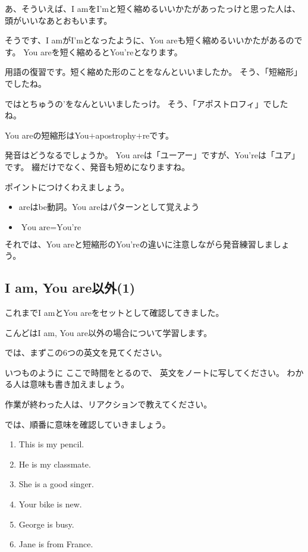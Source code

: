 \documentclass[book,jafontscale=0.9247]{jlreq}
\newcommand{\mySagyo}{%
\begin{minipage}[t]{.98\textwidth}
\mbox{}\hrulefill\mbox{}\par%
\mbox{}\hfill{}\raisebox{-5pt}{作業}\hfill\mbox{}\par%
\mbox{}\hrulefill\mbox{}
\end{minipage}%
\par%
\bigskip
}
\begin{document}
あ、そういえば、I amをI'mと短く縮めるいいかたがあったっけと思った人は、
頭がいいなあとおもいます。

そうです、I amがI'mとなったように、You areも短く縮めるいいかたがあるのです。
You areを短く縮めるとYou'reとなります。

用語の復習です。短く縮めた形のことをなんといいましたか。
そう、「短縮形」でしたね。

ではとちゅうの'をなんといいましたっけ。
そう、「ア{\gtfamily ポ}ストロフィ」でしたね。

You areの短縮形はYou$+$apostrophy$+$reです。

発音はどうなるでしょうか。
You areは「ユーアー」ですが、You'reは「ユア」です。
綴だけでなく、発音も短めになりますね。


ポイントにつけくわえましょう。

\begin{itemize}
 \item areはbe動詞。You areはパターンとして覚えよう
 \item {\gtfamily $\text{You are}=\text{You're}$}
\end{itemize}

それでは、You areと短縮形のYou'reの違いに注意しながら発音練習しましょう。
\newpage

\subsection{I am, You are以外(1)}
{\large \ComputerMouse}
これまでI amとYou areをセットとして確認してきました。

こんどはI am, You are以外の場合について学習します。


では、まずこの6つの英文を見てください。

いつものように
ここで時間をとるので、
英文をノートに写してください。
わかる人は意味も書き加えましょう。

作業が終わった人は、リアクションで教えてください。

\mySagyo

では、順番に意味を確認していきましょう。


\begin{enumerate}
 \item This is my pencil.
 \item He is my classmate.
 \item She is a good singer.
 \item Your bike is new.
 \item George is busy.
 \item Jane is from France.
\end{enumerate}
\end{document}
